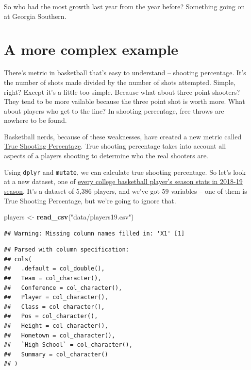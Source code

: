 \documentclass[]{book}
\newenvironment{Shaded}{\begin{snugshade}}{\end{snugshade}}
\newcommand{\KeywordTok}[1]{\textcolor[rgb]{0.13,0.29,0.53}{\textbf{#1}}}
\newcommand{\NormalTok}[1]{#1}
\newcommand{\StringTok}[1]{\textcolor[rgb]{0.31,0.60,0.02}{#1}}
\begin{document}
So who had the most growth last year from the year before? Something going on at Georgia Southern.

\hypertarget{a-more-complex-example}{%
\section{A more complex example}\label{a-more-complex-example}}

There's metric in basketball that's easy to understand -- shooting percentage. It's the number of shots made divided by the number of shots attempted. Simple, right? Except it's a little too simple. Because what about three point shooters? They tend to be more vailable because the three point shot is worth more. What about players who get to the line? In shooting percentage, free throws are nowhere to be found.

Basketball nerds, because of these weaknesses, have created a new metric called \href{https://en.wikipedia.org/wiki/True_shooting_percentage}{True Shooting Percentage}. True shooting percentage takes into account all aspects of a players shooting to determine who the real shooters are.

Using \texttt{dplyr} and \texttt{mutate}, we can calculate true shooting percentage. So let's look at a new dataset, one of \href{https://unl.box.com/s/s1wzw61u9ia50qmirfhuvprgpmmah9rj}{every college basketball player's season stats in 2018-19 season}. It's a dataset of 5,386 players, and we've got 59 variables -- one of them is True Shooting Percentage, but we're going to ignore that.

\begin{Shaded}
\begin{Highlighting}[]
\NormalTok{players <-}\StringTok{ }\KeywordTok{read_csv}\NormalTok{(}\StringTok{"data/players19.csv"}\NormalTok{)}
\end{Highlighting}
\end{Shaded}

\begin{verbatim}
## Warning: Missing column names filled in: 'X1' [1]
\end{verbatim}

\begin{verbatim}
## Parsed with column specification:
## cols(
##   .default = col_double(),
##   Team = col_character(),
##   Conference = col_character(),
##   Player = col_character(),
##   Class = col_character(),
##   Pos = col_character(),
##   Height = col_character(),
##   Hometown = col_character(),
##   `High School` = col_character(),
##   Summary = col_character()
## )
\end{verbatim}
\end{document}
